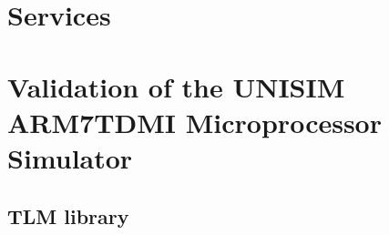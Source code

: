 \documentclass[a4paper,11pt,onecolumn]{mathese}
\begin{document}
\chapter{Services}
\label{services}


\chapter{Validation of the UNISIM ARM7TDMI Microprocessor Simulator}
\label{arm7tdmi_validation}


\begin{appendix}
\chapter{TLM library}
\label{tlm_appendix}


\end{appendix}

% 
%  

%
%
\end{document}
